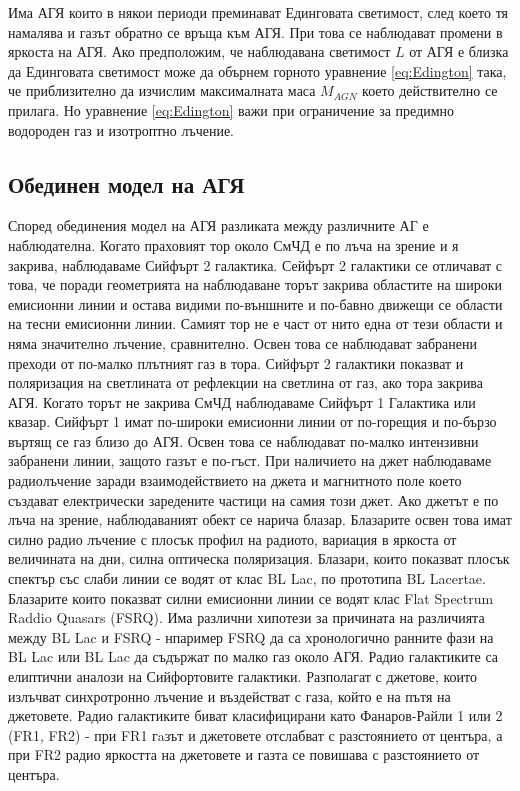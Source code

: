 \documentclass[a4paper,12pt]{article}
\begin{document}
Има АГЯ които в някои периоди преминават Единговата светимост, след което тя намалява и газът обратно се връща към АГЯ. При това се наблюдават промени в яркоста на АГЯ. Ако предположим, че наблюдавана светимост $L$ от АГЯ е близка да Единговата светимост може да обърнем горното уравнение \ref{eq:Edington} така, че приблизително да изчислим максималната маса $M_{AGN}$ което действително се прилага. Но уравнение \ref{eq:Edington} важи при ограничение за предимно водороден газ и изотроптно лъчение.

\subsection{Обединен модел на АГЯ}

Според обединения модел на АГЯ разликата между различните АГ е наблюдателна. Когато праховият тор около СмЧД е по лъча на зрение и я закрива, наблюдаваме Сийфърт 2 галактика. Сейфърт 2 галактики се отличават с това, че поради геометрията на наблюдаване торът закрива областите на широки емисионни линии и остава видими по-външните и по-бавно движещи се области на тесни емисионни линии. Самият тор не е част от нито една от тези области и няма значително лъчение, сравнително. Освен това се наблюдават забранени преходи от по-малко плътният газ в тора. Сийфърт 2 галактики показват и поляризация на светлината от рефлекции на светлина от газ, ако тора закрива АГЯ. Когато торът не закрива СмЧД наблюдаваме Сийфърт 1 Галактика или квазар. Сийфърт 1 имат по-широки емисионни линии от по-горещия и по-бързо въртящ се газ близо до АГЯ. Освен това се наблюдават по-малко интензивни забранени линии, защото газът е по-гъст. При наличието на джет наблюдаваме радиолъчение заради взаимодействието на джета и магнитното поле което създават електрически заредените частици на самия този джет. Ако джетът е по лъча на зрение, наблюдаваният обект се нарича блазар. Блазарите освен това имат силно радио лъчение с плосък профил на радиото, вариация в яркоста от величината на дни, силна оптическа поляризация. Блазари, които показват плосък спектър със слаби линии се водят от клас BL Lac, по прототипа BL Lacertae. Блазарите които показват силни емисионни линии се водят клас Flat Spectrum Raddio Quasars (FSRQ). Има различни хипотези за причината на различията между BL Lac и FSRQ - нпаример FSRQ да са хронологично ранните фази на BL Lac или BL Lac да съдържат по малко газ около АГЯ. Радио галактиките са елиптични аналози на Сийфортовите галактики. Разполагат с джетове, които излъчват синхротронно лъчение и въздействат с газа, който е на пътя на джетовете. Радио галактиките биват класифицирани като Фанаров-Райли 1 или 2 (FR1, FR2) - при FR1 гaзът и джетовете отслабват с разстоянието от центъра, а при FR2 радио яркостта на джетовете и газта се повишава с разстоянието от центъра.\\
\end{document}
